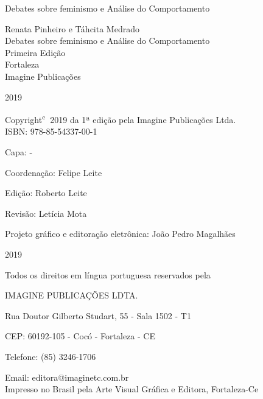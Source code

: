 \documentclass[hidelinks, 4pt]{bookest}
\let\orignewcommand\newcommand  %
\let\newcommand\providecommand  %
\let\newcommand\orignewcommand  %
\newcommand\blankpage{%
    \null
    \thispagestyle{empty}%
    \addtocounter{page}{-1}%
    \newpage}
\newcounter{nopage}
\newenvironment{nopage}
 {\clearpage\stepcounter{nopage}%
  \renewcommand{\thepage}{}%
  \thispagestyle{empty}}
 {\clearpage\addtocounter{page}{-1}}
\begin{document}
%
\begin{titlepage}
    \vspace*{\fill}
    \begin{center}
        {\Huge Debates sobre feminismo e Análise do Comportamento}
    \end{center}
    \vspace*{\fill}
    \pagestyle{empty}
    \afterpage{\null\newpage}
    \blankpage
\begin{center}
    \vfill
\end{center}
\begin{center}
{\Large Renata Pinheiro e Táhcita Medrado }\\[4cm]
{\Huge Debates sobre feminismo e Análise do Comportamento}\\[4cm]

{\Large Primeira Edição}\\[3cm]


{\large Fortaleza\\
Imagine Publicações}

2019
\pagebreak
\thispagestyle{empty}
\end{center}
\pagebreak

Copyright\textsuperscript{\textcircled{c}} 2019 da 1ª edição pela Imagine Publicações Ltda.\\

ISBN: 978-85-54337-00-1

Capa: -

Coordenação: Felipe Leite

Edição: Roberto Leite

Revisão: Letícia Mota

Projeto gráfico e editoração eletrônica: João Pedro Magalhães\\
\vfill
\begin{center}
\end{center}

2019

Todos os direitos em língua portuguesa reservados pela

IMAGINE PUBLICAÇÕES LDTA.

Rua Doutor Gilberto Studart, 55 - Sala 1502 - T1

CEP: 60192-105 - Cocó - Fortaleza - CE

Telefone: (85) 3246-1706

Email: editora@imaginetc.com.br\\

Impresso no Brasil pela Arte Visual Gráfica e Editora, Fortaleza-Ce
\thispagestyle{empty}
\end{titlepage}
\begin{nopage}

\tableofcontents
\end{nopage}
\addtocounter{page}{-8}












\end{document}

